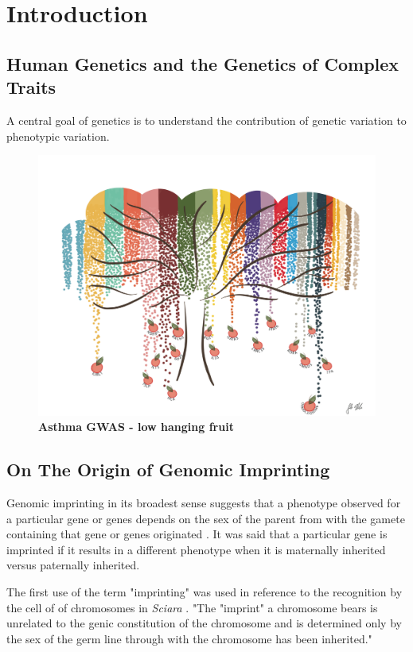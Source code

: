 \chapter{Introduction}

\section{Human Genetics and the Genetics of Complex Traits}

A central goal of genetics is to understand the contribution of genetic variation to phenotypic variation.


\begin{figure}
\centering
\includegraphics[width=5in]{img/ch01/fig-01-lowhangingfruit.pdf}
\caption[Low Hanging Fruit.]{\textbf{Asthma GWAS - low hanging fruit}}
\label{fig:lowhangingfruit}
\end{figure}


\section{On The Origin of Genomic Imprinting }

Genomic imprinting in its broadest sense suggests that a phenotype observed for a particular gene or genes depends on the sex of the parent from with the gamete containing that gene or genes originated \cite{Sapienza:1989vm}. It was said that a particular gene is imprinted if it results in a different phenotype when it is maternally inherited versus paternally inherited.

The first use of the term "imprinting" was used in reference to the recognition by the cell of of chromosomes in \textit{Sciara} \cite{Crouse:1960vc,Sapienza:1989vm}. "The "imprint" a chromosome bears is unrelated to the genic constitution of the chromosome and is determined only by the sex of the germ line through with the chromosome has been inherited." \cite{Crouse:1960vc} 

